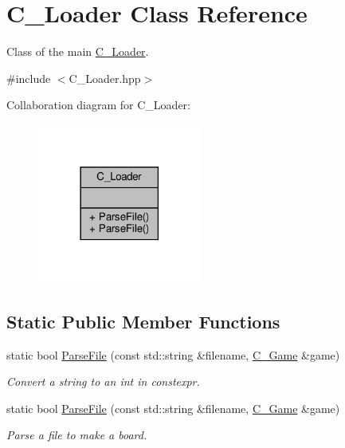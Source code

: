 \hypertarget{classC__Loader}{}\section{C\+\_\+\+Loader Class Reference}
\label{classC__Loader}


Class of the main \hyperlink{classC__Loader}{C\+\_\+\+Loader}.  




{\ttfamily \#include $<$C\+\_\+\+Loader.\+hpp$>$}



Collaboration diagram for C\+\_\+\+Loader\+:\nopagebreak
\begin{figure}[H]
\begin{center}
\leavevmode
\includegraphics[width=153pt]{classC__Loader__coll__graph}
\end{center}
\end{figure}
\subsection*{Static Public Member Functions}
\begin{DoxyCompactItemize}
\item 
static bool \hyperlink{classC__Loader_a7a6f0089933a6108eb92390afe0ead80}{Parse\+File} (const std\+::string \&filename, \hyperlink{classC__Game}{C\+\_\+\+Game} \&game)
\begin{DoxyCompactList}\small\item\em Convert a string to an int in constexpr. \end{DoxyCompactList}\item 
static bool \hyperlink{classC__Loader_aaa555ff55462405a34610adc1055371e}{Parse\+File} (const std\+::string \&filename, \hyperlink{classC__Game}{C\+\_\+\+Game} \&game)
\begin{DoxyCompactList}\small\item\em Parse a file to make a board. \end{DoxyCompactList}\end{DoxyCompactItemize}


